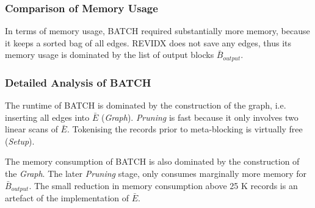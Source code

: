 \documentclass[a4paper,12pt]{article}
\begin{document}
\subsubsection{Comparison of Memory Usage}
In terms of memory usage, BATCH required substantially more memory, because it keeps a sorted bag of all edges. REVIDX does not save any edges, thus its memory usage is dominated by the list of output blocks $\bar B_{output}$.

\begin{center}
\end{center}

\subsubsection{Detailed Analysis of BATCH}
The runtime of BATCH is dominated by the construction of the graph, i.e. inserting all edges into $\bar E$ (\emph{Graph}). \emph{Pruning} is fast because it only involves two linear scans of $\bar E$. Tokenising the records prior to meta-blocking is virtually free (\emph{Setup}). 

\begin{center}
\end{center}

The memory consumption of BATCH is also dominated by the construction of the \emph{Graph}. The later \emph{Pruning} stage, only consumes marginally more memory for $\bar B_{output}$. The small reduction in memory consumption above 25 K records is an artefact of the implementation of $\bar E$. \\
\end{document}
